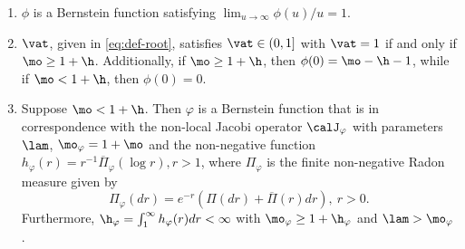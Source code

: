 \skpt
\begin{lemma}
\label{lem:phi-Psi1-claims}
\begin{enumerate}
\item \label{item-0:lem:phi-Psi1-claims} $\phi$ is a Bernstein function satisfying $\lim_{u\to\infty} \phi(u)/u =1$.
\item \label{item-1:lem:phi-Psi1-claims}
$\vat$, given in \eqref{eq:def-root}, satisfies $\vat \in (0,1]$ with $\vat = 1$ if and only if $\mo \geq 1+\h$. Additionally, if $\mo \geq 1+\h$, then $\phi(0) = \mo-\h - 1$, while if $\mo < 1+\h$, then $\phi(0) = 0$.

\item \label{item-2:lem:phi-Psi1-claims}
Suppose $\mo < 1+\h$. Then $\varphi$ is a Bernstein function that is in correspondence with the non-local Jacobi operator $\calJ_\varphi$ with parameters $\lam$, $\mo_\varphi = 1+\mo$ and the non-negative function $h_\varphi(r)=r^{-1}\overline{\Pi}_\varphi(\log r), r>1$, where $\Pi_\varphi$ is the finite non-negative Radon measure given by
\begin{equation*}
\Pi_\varphi(dr) = e^{-r}\left(\Pi(dr)+\overline{\Pi}(r)dr\right), \ r > 0.
\end{equation*}
Furthermore, $\h_\varphi = \int_1^\infty h_\varphi(r)dr < \infty$ with $\mo_\varphi \geq 1+\h_\varphi$ and $\lam > \mo_\varphi$.
\end{enumerate}
\end{lemma}

